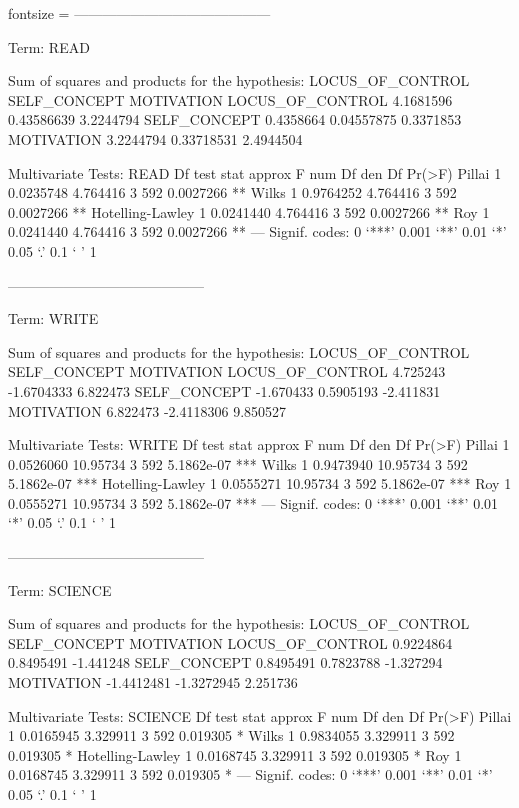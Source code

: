 \documentclass{article}
\begin{document}
\begin{enumerate}[leftmargin = 0 em, label = \arabic*., font = \bfseries]
\begin{enumerate}
\begin{rcode*}{fontsize = \footnotesize}
------------------------------------------
 
Term: READ 

Sum of squares and products for the hypothesis:
                 LOCUS_OF_CONTROL SELF_CONCEPT MOTIVATION
LOCUS_OF_CONTROL        4.1681596   0.43586639  3.2244794
SELF_CONCEPT            0.4358664   0.04557875  0.3371853
MOTIVATION              3.2244794   0.33718531  2.4944504

Multivariate Tests: READ
                 Df test stat approx F num Df den Df    Pr(>F)   
Pillai            1 0.0235748 4.764416      3    592 0.0027266 **
Wilks             1 0.9764252 4.764416      3    592 0.0027266 **
Hotelling-Lawley  1 0.0241440 4.764416      3    592 0.0027266 **
Roy               1 0.0241440 4.764416      3    592 0.0027266 **
---
Signif. codes:  0 ‘***’ 0.001 ‘**’ 0.01 ‘*’ 0.05 ‘.’ 0.1 ‘ ’ 1

------------------------------------------
 
Term: WRITE 

Sum of squares and products for the hypothesis:
                 LOCUS_OF_CONTROL SELF_CONCEPT MOTIVATION
LOCUS_OF_CONTROL         4.725243   -1.6704333   6.822473
SELF_CONCEPT            -1.670433    0.5905193  -2.411831
MOTIVATION               6.822473   -2.4118306   9.850527

Multivariate Tests: WRITE
                 Df test stat approx F num Df den Df     Pr(>F)    
Pillai            1 0.0526060 10.95734      3    592 5.1862e-07 ***
Wilks             1 0.9473940 10.95734      3    592 5.1862e-07 ***
Hotelling-Lawley  1 0.0555271 10.95734      3    592 5.1862e-07 ***
Roy               1 0.0555271 10.95734      3    592 5.1862e-07 ***
---
Signif. codes:  0 ‘***’ 0.001 ‘**’ 0.01 ‘*’ 0.05 ‘.’ 0.1 ‘ ’ 1

------------------------------------------
 
Term: SCIENCE 

Sum of squares and products for the hypothesis:
                 LOCUS_OF_CONTROL SELF_CONCEPT MOTIVATION
LOCUS_OF_CONTROL        0.9224864    0.8495491  -1.441248
SELF_CONCEPT            0.8495491    0.7823788  -1.327294
MOTIVATION             -1.4412481   -1.3272945   2.251736

Multivariate Tests: SCIENCE
                 Df test stat approx F num Df den Df   Pr(>F)  
Pillai            1 0.0165945 3.329911      3    592 0.019305 *
Wilks             1 0.9834055 3.329911      3    592 0.019305 *
Hotelling-Lawley  1 0.0168745 3.329911      3    592 0.019305 *
Roy               1 0.0168745 3.329911      3    592 0.019305 *
---
Signif. codes:  0 ‘***’ 0.001 ‘**’ 0.01 ‘*’ 0.05 ‘.’ 0.1 ‘ ’ 1


\end{rcode*}
\end{enumerate}
\end{enumerate}
\end{document}
